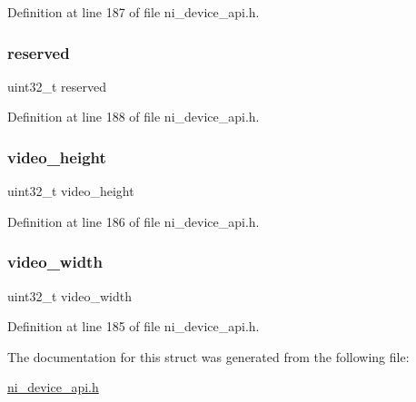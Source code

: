Definition at line 187 of file ni\+\_\+device\+\_\+api.\+h.

\mbox{\label{struct__ni__context__query_aa43c4c21b173ada1b6b7568956f0d650}} 
\subsubsection{\texorpdfstring{reserved}{reserved}}
{\footnotesize\ttfamily uint32\+\_\+t reserved}



Definition at line 188 of file ni\+\_\+device\+\_\+api.\+h.

\mbox{\label{struct__ni__context__query_af65e7328fad30f40770959957538da7c}} 
\subsubsection{\texorpdfstring{video\_height}{video\_height}}
{\footnotesize\ttfamily uint32\+\_\+t video\+\_\+height}



Definition at line 186 of file ni\+\_\+device\+\_\+api.\+h.

\mbox{\label{struct__ni__context__query_a94c61f9d8155afb285177936e9fa30ce}} 
\subsubsection{\texorpdfstring{video\_width}{video\_width}}
{\footnotesize\ttfamily uint32\+\_\+t video\+\_\+width}



Definition at line 185 of file ni\+\_\+device\+\_\+api.\+h.



The documentation for this struct was generated from the following file\+:\begin{DoxyCompactItemize}
\item 
\mbox{\hyperlink{ni__device__api_8h}{ni\+\_\+device\+\_\+api.\+h}}\end{DoxyCompactItemize}
